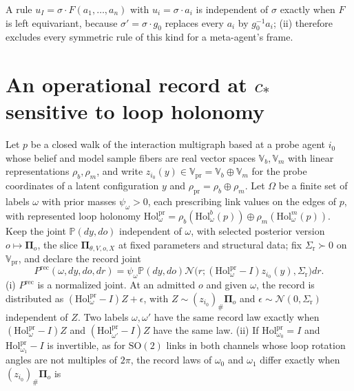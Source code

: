 A rule $u_I=\sigma\cdot F(a_1,\ldots,a_n)$ with $u_i=\sigma\cdot a_i$ is independent of $\sigma$ exactly when
$F$ is left equivariant, because $\sigma'=\sigma\cdot g_0$ replaces every $a_i$ by $g_0^{-1}a_i$; (ii)
therefore excludes every symmetric rule of this kind for a meta-agent's frame.

\section{An operational record at \texorpdfstring{$c_*$}{c*} sensitive to loop holonomy}

Let $p$ be a closed walk of the interaction multigraph based at a probe agent $i_0$ whose belief and model
sample fibers are real vector spaces $\mathbb V_b,\mathbb V_m$ with linear representations $\rho_b,\rho_m$, and write
$z_{i_0}(y)\in \mathbb V_{\mathrm{pr}}=\mathbb V_b\oplus \mathbb V_m$ for the probe coordinates of a latent configuration $y$ and
$\rho_{\mathrm{pr}}=\rho_b\oplus\rho_m$. Let $\Omega$ be a finite set of labels $\omega$ with prior masses
$\psi_\omega>0$, each prescribing link values on the edges of $p$, with represented loop holonomy
$\mathrm{Hol}^{\mathrm{pr}}_\omega=\rho_b(\mathrm{Hol}^b_\omega(p))\oplus\rho_m(\mathrm{Hol}^m_\omega(p))$. Keep
the joint $\mathbb P(dy,do)$ independent of $\omega$, with selected posterior version
$o\mapsto\boldsymbol\Pi_o$, the slice $\boldsymbol\Pi_{\theta,V,o,X}$ at fixed parameters and structural
data; fix $\Sigma_{\mathrm r}\succ0$ on $\mathbb V_{\mathrm{pr}}$, and declare the record joint
\[
P^{\mathrm{rec}}(\omega,dy,do,dr)=\psi_\omega\mathbb P(dy,do)
\mathcal N\bigl(r;(\mathrm{Hol}^{\mathrm{pr}}_\omega-I)z_{i_0}(y),\Sigma_{\mathrm r}\bigr)dr.
\]
(i) $P^{\mathrm{rec}}$ is a normalized joint. At an admitted $o$ and given $\omega$, the record is
distributed as $(\mathrm{Hol}^{\mathrm{pr}}_\omega-I)Z+\epsilon$, with $Z\sim(z_{i_0})_\#\boldsymbol\Pi_o$ and
$\epsilon\sim\mathcal N(0,\Sigma_{\mathrm r})$ independent of $Z$. Two labels $\omega,\omega'$ have the same
record law exactly when $(\mathrm{Hol}^{\mathrm{pr}}_\omega-I)Z$ and $(\mathrm{Hol}^{\mathrm{pr}}_{\omega'}-I)Z$
have the same law. (ii) If $\mathrm{Hol}^{\mathrm{pr}}_{\omega_0}=I$ and $\mathrm{Hol}^{\mathrm{pr}}_{\omega_1}-I$
is invertible, as for $\mathrm{SO}(2)$ links in both channels whose loop rotation angles are not multiples
of $2\pi$, the record laws of $\omega_0$ and $\omega_1$ differ exactly when $(z_{i_0})_\#\boldsymbol\Pi_o$ is
